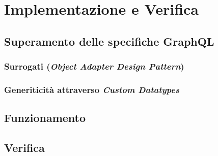 \chapter{Implementazione e Verifica}\label{chap:implementation}
\section{Superamento delle specifiche GraphQL}\label{sec:overcoming-gql-specs}
\subsection{Surrogati (\textit{Object Adapter Design Pattern})}\label{ssec:surrogates}
\subsection{Generiticità attraverso \textit{Custom Datatypes}}\label{ssec:custom-dtypes}
\section{Funzionamento}\label{sec:functioning}
\section{Verifica}\label{sec:testing}

